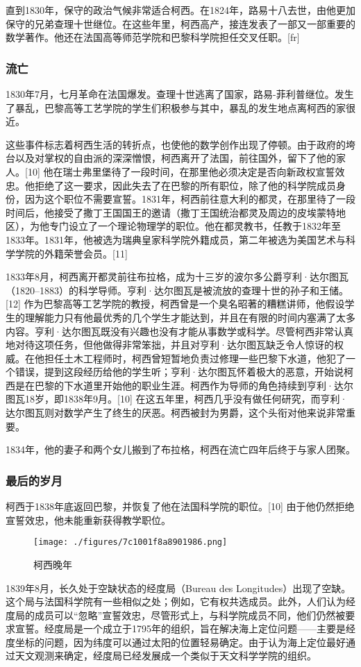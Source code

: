 直到1830年，保守的政治气候非常适合柯西。在1824年，路易十八去世，由他更加保守的兄弟查理十世继位。在这些年里，柯西高产，接连发表了一部又一部重要的数学著作。他还在法国高等师范学院和巴黎科学院担任交叉任职。[fr]
\subsubsection{流亡}  
1830年7月，七月革命在法国爆发。查理十世逃离了国家，路易-菲利普继位。发生了暴乱，巴黎高等工艺学院的学生们积极参与其中，暴乱的发生地点离柯西的家很近。

这些事件标志着柯西生活的转折点，也使他的数学创作出现了停顿。由于政府的垮台以及对掌权的自由派的深深憎恨，柯西离开了法国，前往国外，留下了他的家人。[10] 他在瑞士弗里堡待了一段时间，在那里他必须决定是否向新政权宣誓效忠。他拒绝了这一要求，因此失去了在巴黎的所有职位，除了他的科学院成员身份，因为这个职位不需要宣誓。1831年，柯西前往意大利的都灵，在那里待了一段时间后，他接受了撒丁王国国王的邀请（撒丁王国统治都灵及周边的皮埃蒙特地区），为他专门设立了一个理论物理学的职位。他在都灵教书，任教于1832年至1833年。1831年，他被选为瑞典皇家科学院外籍成员，第二年被选为美国艺术与科学学院的外籍荣誉会员。[11]

1833年8月，柯西离开都灵前往布拉格，成为十三岁的波尔多公爵亨利·达尔图瓦（1820–1883）的科学导师。亨利·达尔图瓦是被流放的查理十世的孙子和王储。[12] 作为巴黎高等工艺学院的教授，柯西曾是一个臭名昭著的糟糕讲师，他假设学生的理解能力只有他最优秀的几个学生才能达到，并且在有限的时间内塞满了太多内容。亨利·达尔图瓦既没有兴趣也没有才能从事数学或科学。尽管柯西非常认真地对待这项任务，但他做得非常笨拙，并且对亨利·达尔图瓦缺乏令人惊讶的权威。在他担任土木工程师时，柯西曾短暂地负责过修理一些巴黎下水道，他犯了一个错误，提到这段经历给他的学生听；亨利·达尔图瓦怀着极大的恶意，开始说柯西是在巴黎的下水道里开始他的职业生涯。柯西作为导师的角色持续到亨利·达尔图瓦18岁，即1838年9月。[10] 在这五年里，柯西几乎没有做任何研究，而亨利·达尔图瓦则对数学产生了终生的厌恶。柯西被封为男爵，这个头衔对他来说非常重要。

1834年，他的妻子和两个女儿搬到了布拉格，柯西在流亡四年后终于与家人团聚。
\subsubsection{最后的岁月}  
柯西于1838年底返回巴黎，并恢复了他在法国科学院的职位。[10] 由于他仍然拒绝宣誓效忠，他未能重新获得教学职位。
\begin{figure}[ht]
\centering
\texttt{[image: ./figures/7c1001f8a8901986.png]}
\caption{柯西晚年} \label{fig_August_2}
\end{figure}
1839年8月，长久处于空缺状态的经度局（Bureau des Longitudes）出现了空缺。这个局与法国科学院有一些相似之处；例如，它有权共选成员。此外，人们认为经度局的成员可以“忽略”宣誓效忠，尽管形式上，与科学院成员不同，他们仍然被要求宣誓。经度局是一个成立于1795年的组织，旨在解决海上定位问题——主要是经度坐标的问题，因为纬度可以通过太阳的位置轻易确定。由于认为海上定位最好通过天文观测来确定，经度局已经发展成一个类似于天文科学学院的组织。


